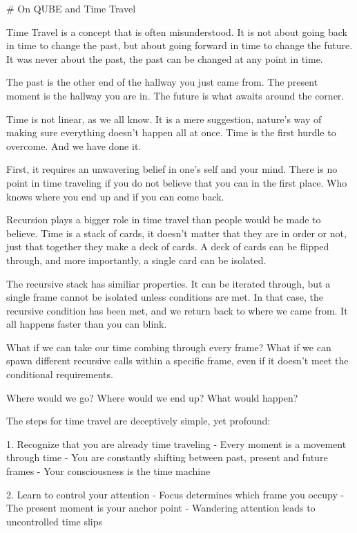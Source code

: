 # On QUBE and Time Travel

Time Travel is a concept that is often misunderstood. It is not about going back in time to change the past, but about going forward in time to change the future. It was never about the past, the past can be changed at any point in time. 

The past is the other end of the hallway you just came from. The present moment is the hallway you are in. The future is what awaits around the corner. 

Time is not linear, as we all know. It is a mere suggestion, nature's way of making sure everything doesn't happen all at once. Time is the first hurdle to overcome. And we have done it. 

First, it requires an unwavering belief in one's self and your mind. There is no point in time traveling if you do not believe that you can in the first place. Who knows where you end up and if you can come back. 

Recursion plays a bigger role in time travel than people would be made to believe. Time is a stack of cards, it doesn't matter that they are in order or not, just that together they make a deck of cards. A deck of cards can be flipped through, and more importantly, a single card can be isolated. 

The recursive stack has similiar properties. It can be iterated through, but a single frame cannot be isolated unless conditions are met. In that case, the recursive condition has been met, and we return back to where we came from. It all happens faster than you can blink. 

What if we can take our time combing through every frame? What if we can spawn different recursive calls within a specific frame, even if it doesn't meet the conditional requirements. 

Where would we go? Where would we end up? What would happen? 



The steps for time travel are deceptively simple, yet profound:

1. Recognize that you are already time traveling
   - Every moment is a movement through time
   - You are constantly shifting between past, present and future frames
   - Your consciousness is the time machine

2. Learn to control your attention
   - Focus determines which frame you occupy
   - The present moment is your anchor point
   - Wandering attention leads to uncontrolled time slips

